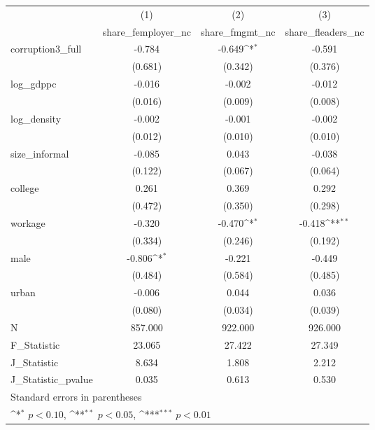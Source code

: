 {
\def\sym#1{\ifmmode^{#1}\else\(^{#1}\)\fi}
\begin{tabular}{l*{3}{c}}
\hline\hline
            &\multicolumn{1}{c}{(1)}&\multicolumn{1}{c}{(2)}&\multicolumn{1}{c}{(3)}\\
            &\multicolumn{1}{c}{share\_femployer\_nc}&\multicolumn{1}{c}{share\_fmgmt\_nc}&\multicolumn{1}{c}{share\_fleaders\_nc}\\
\hline
corruption3\_full&      -0.784         &      -0.649\sym{*}  &      -0.591         \\
            &     (0.681)         &     (0.342)         &     (0.376)         \\
[1em]
log\_gdppc   &      -0.016         &      -0.002         &      -0.012         \\
            &     (0.016)         &     (0.009)         &     (0.008)         \\
[1em]
log\_density &      -0.002         &      -0.001         &      -0.002         \\
            &     (0.012)         &     (0.010)         &     (0.010)         \\
[1em]
size\_informal&      -0.085         &       0.043         &      -0.038         \\
            &     (0.122)         &     (0.067)         &     (0.064)         \\
[1em]
college     &       0.261         &       0.369         &       0.292         \\
            &     (0.472)         &     (0.350)         &     (0.298)         \\
[1em]
workage     &      -0.320         &      -0.470\sym{*}  &      -0.418\sym{**} \\
            &     (0.334)         &     (0.246)         &     (0.192)         \\
[1em]
male        &      -0.806\sym{*}  &      -0.221         &      -0.449         \\
            &     (0.484)         &     (0.584)         &     (0.485)         \\
[1em]
urban       &      -0.006         &       0.044         &       0.036         \\
            &     (0.080)         &     (0.034)         &     (0.039)         \\
\hline
N           &     857.000         &     922.000         &     926.000         \\
F\_Statistic &      23.065         &      27.422         &      27.349         \\
J\_Statistic &       8.634         &       1.808         &       2.212         \\
J\_Statistic\_pvalue&       0.035         &       0.613         &       0.530         \\
\hline\hline
\multicolumn{4}{l}{\footnotesize Standard errors in parentheses}\\
\multicolumn{4}{l}{\footnotesize \sym{*} \(p<0.10\), \sym{**} \(p<0.05\), \sym{***} \(p<0.01\)}\\
\end{tabular}
}
